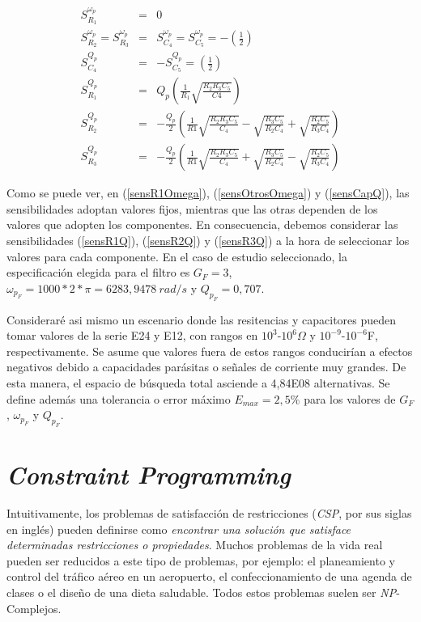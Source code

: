 \documentclass{llncs}
\begin{document}
	\begin{eqnarray}
		S_{R_1}^{\omega_p} &=& 0 \label{sensR1Omega}\\
		S_{R_2}^{\omega_p} = S_{R_3}^{\omega_p} &=& S_{C_4}^{\omega_p} = S_{C_5}^{\omega_p} = -\left(\frac{1}{2}\right) \label{sensOtrosOmega}\\
		S_{C_4}^{Q_p} &=& - S_{C_5}^{Q_p} = \left(\frac{1}{2}\right) \label{sensCapQ}\\
		S_{R_1}^{Q_p} &=& Q_p \left(\frac{1}{R_1} \sqrt{\frac{R_2 R_3 C_5}{C4}}\right) \label{sensR1Q}\\
		S_{R_2}^{Q_p} &=& - \frac{Q_p}{2} \left(\frac{1}{R1} \sqrt{\frac{R_2 R_3 C_5}{C_4}} - \sqrt{\frac{R_3 C_5}{R_2 C_4}} + \sqrt{\frac{R_2 C_5}{R_3 C_4}}\right) \label{sensR2Q}\\
		S_{R_3}^{Q_p} &=& - \frac{Q_p}{2} \left(\frac{1}{R1} \sqrt{\frac{R_2 R_3 C_5}{C_4}} + \sqrt{\frac{R_3 C_5}{R_2 C_4}} - \sqrt{\frac{R_2 C_5}{R_3 C_4}}\right) \label{sensR3Q}
	\end{eqnarray}
	
	Como se puede ver, en (\ref{sensR1Omega}), (\ref{sensOtrosOmega}) y (\ref{sensCapQ}), las
	sensibilidades adoptan valores fijos, mientras que las otras dependen de los valores que adopten los componentes. En consecuencia, debemos considerar las sensibilidades (\ref{sensR1Q}), (\ref{sensR2Q}) y (\ref{sensR3Q}) a la hora de seleccionar los valores para cada componente.
	En el caso de estudio seleccionado, la especificación elegida para el filtro es $G_F = 3$,
	$\omega_{p_F}=1000*2*\pi = 6283,9478\ rad/s$ y $Q_{p_F} = 0,707$. 
	
	Consideraré asi mismo un escenario donde las resitencias y capacitores pueden tomar valores de la serie E24 y E12, con rangos en $10^3$-$10^6$$\Omega$ y $10^{-9}$-$10^{-6}$F, respectivamente. Se asume que valores fuera de estos rangos conducirían a efectos negativos debido a capacidades parásitas o señales de corriente muy grandes. De esta manera, el espacio de búsqueda total asciende a 4,84E08 alternativas. Se
	define además una tolerancia o error máximo $E_{max} = 2,5\%$ para los valores de $G_F$,
	$\omega_{p_F}$ y $Q_{p_F}$.
	
    
  \section{\textbf{\textit{Constraint Programming}}}
    \label{sec:fundprog}
    Intuitivamente, los problemas de satisfacci\'on de restricciones (\textit{CSP}, por sus siglas en inglés) pueden definirse como \textit{encontrar una soluci\'on que satisface determinadas restricciones o pro\-pie\-da\-des}. Muchos problemas de la vida real pueden ser reducidos a 
    este tipo de problemas, por ejemplo: el planeamiento y control del tr\'afico a\'ereo en un aeropuerto, el confeccionamiento de una agenda de clases o el diseño de una dieta saludable. 
    Todos estos problemas suelen ser \textit{NP}-Complejos.
    
\end{document}
